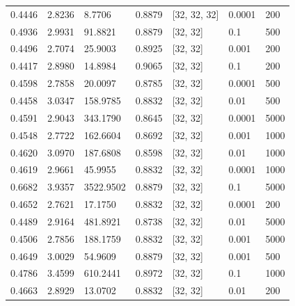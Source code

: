 \begin{tabular}{lllllll}
0.4446 & 2.8236 & 8.7706 & 0.8879 & [32, 32, 32] & 0.0001 & 200 \\
0.4936 & 2.9931 & 91.8821 & 0.8879 & [32, 32] & 0.1 & 500 \\
0.4496 & 2.7074 & 25.9003 & 0.8925 & [32, 32] & 0.001 & 200 \\
0.4417 & 2.8980 & 14.8984 & 0.9065 & [32, 32] & 0.1 & 200 \\
0.4598 & 2.7858 & 20.0097 & 0.8785 & [32, 32] & 0.0001 & 500 \\
0.4458 & 3.0347 & 158.9785 & 0.8832 & [32, 32] & 0.01 & 500 \\
0.4591 & 2.9043 & 343.1790 & 0.8645 & [32, 32] & 0.0001 & 5000 \\
0.4548 & 2.7722 & 162.6604 & 0.8692 & [32, 32] & 0.001 & 1000 \\
0.4620 & 3.0970 & 187.6808 & 0.8598 & [32, 32] & 0.01 & 1000 \\
0.4619 & 2.9661 & 45.9955 & 0.8832 & [32, 32] & 0.0001 & 1000 \\
0.6682 & 3.9357 & 3522.9502 & 0.8879 & [32, 32] & 0.1 & 5000 \\
0.4652 & 2.7621 & 17.1750 & 0.8832 & [32, 32] & 0.0001 & 200 \\
0.4489 & 2.9164 & 481.8921 & 0.8738 & [32, 32] & 0.01 & 5000 \\
0.4506 & 2.7856 & 188.1759 & 0.8832 & [32, 32] & 0.001 & 5000 \\
0.4649 & 3.0029 & 54.9609 & 0.8879 & [32, 32] & 0.001 & 500 \\
0.4786 & 3.4599 & 610.2441 & 0.8972 & [32, 32] & 0.1 & 1000 \\
0.4663 & 2.8929 & 13.0702 & 0.8832 & [32, 32] & 0.01 & 200 \\
\bottomrule
\end{tabular}

